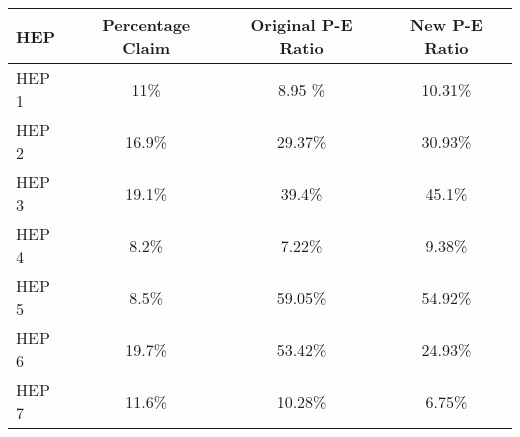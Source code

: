 \documentclass{article}
\begin{document}
\begin{table}
    \begin{tabular}{|lccc|}
    \hline
    HEP & Percentage Claim & Original P-E Ratio & New P-E Ratio \\ \hline
    HEP 1 & 11\% & 8.95 \% & 10.31\% \\
    HEP 2 & 16.9\% & 29.37\% & 30.93\%\\
    HEP 3 & 19.1\% & 39.4\% & 45.1\% \\
    HEP 4 & 8.2\% & 7.22\% & 9.38\% \\
    HEP 5 & 8.5\% & 59.05\% & 54.92\% \\
    HEP 6 & 19.7\% & 53.42\% & 24.93\% \\
    HEP 7 & 11.6\% & 10.28\% & 6.75\% \\ \hline
    \end{tabular}
\end{table}
\end{document}
